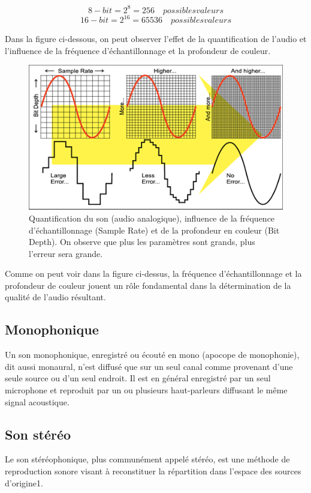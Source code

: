 \documentclass[conference,onecolumn]{IEEEtran}
\begin{document}
\[8-bit = 2^8 = 256 \quad possibles valeurs\]
\[16-bit = 2^{16} = 65536 \quad possibles valeurs\]

Dans la figure ci-dessous, on peut observer l’effet de la quantification de l’audio et l’influence de la fréquence d’échantillonnage et la profondeur de couleur.

 \begin{figure}[H]
 \centering
    \includegraphics[scale=1]{img5.png}
    \caption{Quantification du son (audio analogique), influence de la fréquence d’échantillonnage (Sample Rate) et de la profondeur en couleur (Bit Depth). On observe que plus les paramètres sont grands, plus l’erreur sera grande.}
\end{figure}

Comme on peut voir dans la figure ci-dessus, la fréquence d'échantillonnage et la profondeur de couleur jouent un rôle fondamental dans la détermination de la qualité de l'audio résultant.

\subsection{Monophonique}
 Un son monophonique, enregistré ou écouté en mono (apocope de monophonie), dit aussi monaural, n'est diffusé que sur un seul canal comme provenant d'une seule source ou d'un seul endroit. Il est en général enregistré par un seul microphone et reproduit par un ou plusieurs haut-parleurs diffusant le même signal acoustique.
 
\subsection{Son stéréo}
Le son stéréophonique, plus communément appelé stéréo, est une méthode de reproduction sonore visant à reconstituer la répartition dans l'espace des sources d'origine1.
\end{document}

